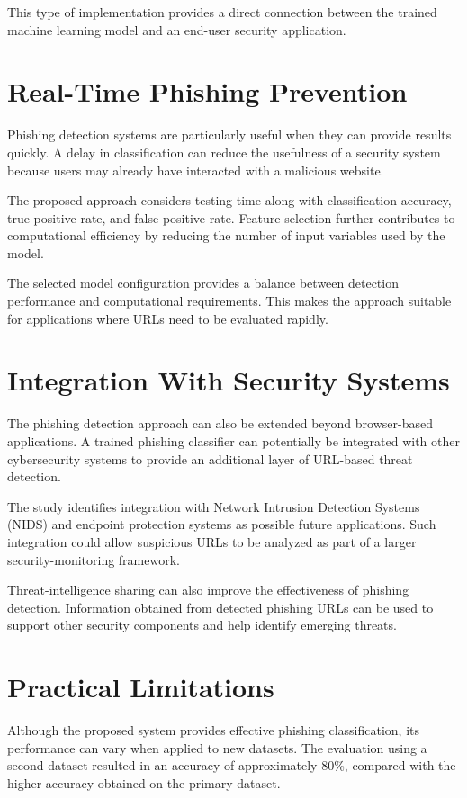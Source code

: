 \documentclass[12pt,a4paper]{report}
\begin{document}
This type of implementation provides a direct connection between the trained machine learning model and an end-user security application.

\section{Real-Time Phishing Prevention}

Phishing detection systems are particularly useful when they can provide results quickly. A delay in classification can reduce the usefulness of a security system because users may already have interacted with a malicious website.

The proposed approach considers testing time along with classification accuracy, true positive rate, and false positive rate. Feature selection further contributes to computational efficiency by reducing the number of input variables used by the model.

The selected model configuration provides a balance between detection performance and computational requirements. This makes the approach suitable for applications where URLs need to be evaluated rapidly.

\section{Integration With Security Systems}

The phishing detection approach can also be extended beyond browser-based applications. A trained phishing classifier can potentially be integrated with other cybersecurity systems to provide an additional layer of URL-based threat detection.

The study identifies integration with Network Intrusion Detection Systems (NIDS) and endpoint protection systems as possible future applications. Such integration could allow suspicious URLs to be analyzed as part of a larger security-monitoring framework.

Threat-intelligence sharing can also improve the effectiveness of phishing detection. Information obtained from detected phishing URLs can be used to support other security components and help identify emerging threats.

\section{Practical Limitations}

Although the proposed system provides effective phishing classification, its performance can vary when applied to new datasets. The evaluation using a second dataset resulted in an accuracy of approximately 80\%, compared with the higher accuracy obtained on the primary dataset.
\end{document}
